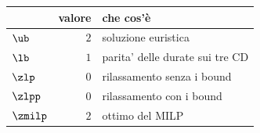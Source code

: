 \begin{center}\small
\begin{tabular}{lrl}
\toprule
 & valore & che cos'è \\
\midrule
$\ub$ & $2$ & soluzione euristica \\
$\lb$ & $1$ & parita' delle durate sui tre CD \\
$\zlp$ & $0$ & rilassamento senza i bound \\
$\zlpp$ & $0$ & rilassamento con i bound \\
$\zmilp$ & $2$ & ottimo del MILP \\
\bottomrule
\end{tabular}
\end{center}

